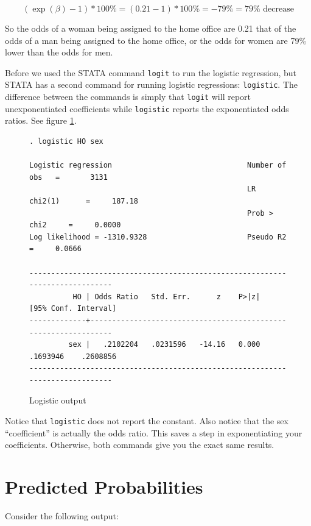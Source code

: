 \documentclass[12pt]{amsart}
\begin{document}
\[ (\exp(\beta)-1)*100\% = (0.21-1)*100\% = -79\% = 79\% \text{ decrease} \]

So the odds of a woman being assigned to the home office are 0.21 that of the odds of a man being assigned to the home office, or the odds for women are 79\% lower than the odds for men.

Before we used the STATA command \texttt{logit} to run the logistic regression, but STATA has a second command for running logistic regressions: \texttt{logistic}. The difference between the commands is simply that \texttt{logit} will report unexponentiated coefficients while \texttt{logistic} reports the exponentiated odds ratios. See figure \ref{fig:three}.

\begin{figure}[htb]
\caption{Logistic output\label{fig:three}}
\begin{verbatim}
. logistic HO sex

Logistic regression                               Number of obs   =       3131
                                                  LR chi2(1)      =     187.18
                                                  Prob > chi2     =     0.0000
Log likelihood = -1310.9328                       Pseudo R2       =     0.0666

------------------------------------------------------------------------------
          HO | Odds Ratio   Std. Err.      z    P>|z|     [95% Conf. Interval]
-------------+----------------------------------------------------------------
         sex |   .2102204   .0231596   -14.16   0.000     .1693946    .2608856
------------------------------------------------------------------------------
\end{verbatim}
\end{figure}

Notice that \texttt{logistic} does not report the constant. Also notice that the sex ``coefficient'' is actually the odds ratio. This saves a step in exponentiating your coefficients. Otherwise, both commands give you the exact same results.

\section{Predicted Probabilities}


Consider the following output:
\end{document}
